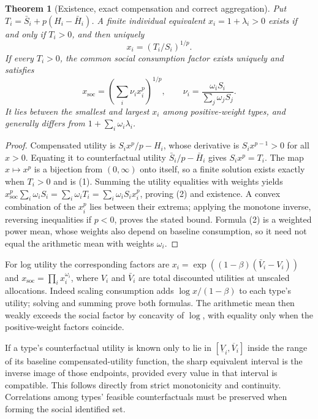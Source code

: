 \documentclass[11pt]{article}
\newtheorem{theorem}{Theorem}
\theoremstyle{remark}
\begin{document}
\begin{theorem}[Existence, exact compensation and correct aggregation]
Put $T_i=\bar S_i+p(H_i-\bar H_i)$. A finite individual equivalent
$x_i=1+\lambda_i>0$ exists if and only if $T_i>0$, and then uniquely
\[
 x_i=(T_i/S_i)^{1/p}.                                             \tag{1}
\]
If every $T_i>0$, the common social consumption factor exists uniquely and
satisfies
\[
 x_{\mathrm{soc}}=
 \left(\sum_i\nu_i x_i^p\right)^{1/p},\qquad
 \nu_i=\frac{\omega_i S_i}{\sum_j\omega_jS_j}.                    \tag{2}
\]
It lies between the smallest and largest $x_i$ among positive-weight
types, and generally differs from $1+\sum_i\omega_i\lambda_i$.
\end{theorem}
\begin{proof}
Compensated utility is $S_ix^p/p-H_i$, whose derivative is
$S_ix^{p-1}>0$ for all $x>0$. Equating it to counterfactual utility
$\bar S_i/p-\bar H_i$ gives $S_ix^p=T_i$. The map $x\mapsto x^p$
is a bijection from $(0,\infty)$ onto itself, so a finite solution exists
exactly when $T_i>0$ and is (1). Summing the utility equalities with
weights yields
$x_{\mathrm{soc}}^p\sum_i\omega_iS_i=
\sum_i\omega_iT_i=\sum_i\omega_iS_ix_i^p$, proving (2) and existence.
A convex combination of the $x_i^p$ lies between their extrema;
applying the monotone inverse, reversing inequalities if $p<0$, proves
the stated bound. Formula (2) is a weighted power mean, whose weights
also depend on baseline consumption, so it need not equal the arithmetic
mean with weights $\omega_i$.
\end{proof}
For log utility the corresponding factors are
$x_i=\exp((1-\beta)(\bar V_i-V_i))$ and
$x_{\mathrm{soc}}=\prod_i x_i^{\omega_i}$, where $V_i$ and $\bar V_i$
are total discounted utilities at unscaled allocations. Indeed scaling
consumption adds $\log x/(1-\beta)$ to each type's utility; solving
and summing prove both formulas. The arithmetic mean then weakly exceeds
the social factor by concavity of $\log$, with equality only when the
positive-weight factors coincide.

If a type's counterfactual utility is known only to lie in
$[\underline V_i,\overline V_i]$ inside the range of its baseline
compensated-utility function, the sharp equivalent interval is the inverse
image of those endpoints, provided every value in that interval is
compatible. This follows directly from strict monotonicity and continuity.
Correlations among types' feasible counterfactuals must be preserved when
forming the social identified set.
\end{document}
